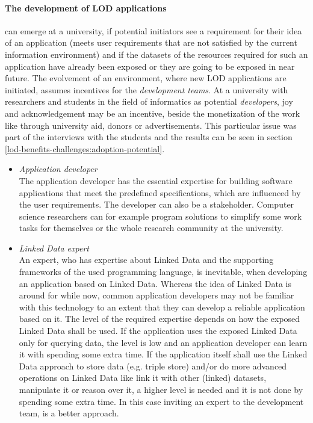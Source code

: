 \documentclass{article}
\begin{document}
\paragraph{The development of LOD applications}
\label{technical-architecture-challenges:lod-effort:dev-app}
can emerge at a university, if potential initiators see a requirement for their idea of an application (meets user requirements that are not satisfied by the current information environment) and if the datasets of the resources required for such an application have already been exposed or they are going to be exposed in near future. The evolvement of an environment, where new LOD applications are initiated, assumes incentives for the \textit{development teams}. At a university with researchers and students in the field of informatics as potential \textit{developers}, joy and acknowledgement may be an incentive, beside the monetization
of the work like through university aid, donors or advertisements. This particular issue was part of the interviews with the students and the results can be seen in section \ref{lod-benefits-challenges:adoption-potential}.

\begin{itemize}
\item \textit{Application developer}~\\
The application developer has the essential expertise for building software applications that meet the predefined specifications, which are influenced by the user requirements. The developer can also be a stakeholder. Computer science researchers can for example program solutions to simplify some work tasks for themselves or the whole research community at the university. 

\item \textit{Linked Data expert}~\\
An expert, who has expertise about Linked Data and the supporting frameworks of the used programming language, is inevitable, when developing an application based on Linked Data. Whereas the idea of Linked Data is around for while now, common application developers may not be familiar with this technology to an extent that they can develop a reliable application based on it. The level of the required expertise depends on how the exposed Linked Data shall be used. If the application uses the exposed Linked Data only for querying data, the level is low and an application developer can learn it with spending some extra time. If the application itself shall use the Linked Data approach to store data (e.g. triple store) and/or do more advanced operations on Linked Data like link it with other (linked) datasets, manipulate it or reason over it, a higher level is needed and it is not done by spending some extra time. In this case inviting an expert to the development team, is a better approach.
\end{itemize}
\end{document}
